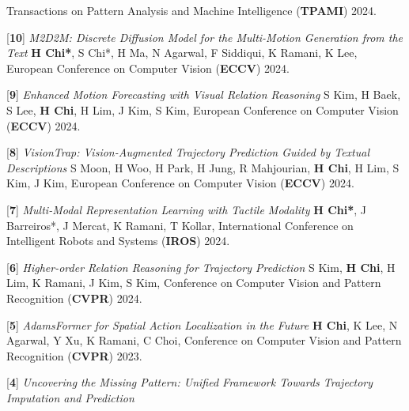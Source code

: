 \begin{cventries}
{\begin{cvitems}
{        Transactions on Pattern Analysis and Machine Intelligence (\textbf{TPAMI}) 2024.}
    \item {[\textbf{10}] \textit{M2D2M: Discrete Diffusion Model for the Multi-Motion Generation from the Text} \newline
        \hspace{1.5em} \textbf{H Chi*}, S Chi*, H Ma, N Agarwal, F Siddiqui, K Ramani, K Lee,
        European Conference on Computer Vision (\textbf{ECCV}) 2024.}
    \item {[\textbf{9}] \textit{Enhanced Motion Forecasting with Visual Relation Reasoning} \newline
        \hspace{1. em}  S Kim, H Baek, S Lee, \textbf{H Chi}, H Lim, J Kim, S Kim,
        European Conference on Computer Vision (\textbf{ECCV}) 2024.}
    \item {[\textbf{8}] \textit{VisionTrap: Vision-Augmented Trajectory Prediction Guided by Textual Descriptions}\newline
        \hspace{1. em}S Moon, H Woo, H Park, H Jung, R Mahjourian, \textbf{H Chi}, H Lim, S Kim, J Kim,
        European Conference on Computer Vision (\textbf{ECCV}) 2024.}
    \item {[\textbf{7}] \textit{Multi-Modal Representation Learning with Tactile Modality} \newline
        \hspace{1. em}\textbf{H Chi*}, J Barreiros*, J Mercat, K Ramani, T Kollar,
        International Conference on Intelligent Robots and Systems (\textbf{IROS}) 2024.}
    \item {[\textbf{6}] \textit{Higher-order Relation Reasoning for Trajectory Prediction}\newline
        \hspace{1. em}S Kim, \textbf{H Chi}, H Lim, K Ramani, J Kim, S Kim,
        Conference on Computer Vision and Pattern Recognition (\textbf{CVPR}) 2024.}
    \item {[\textbf{5}] \textit{AdamsFormer for Spatial Action Localization in the Future} \newline
        \hspace{1. em}\textbf{H Chi}, K Lee, N Agarwal, Y Xu, K Ramani, C Choi,
        Conference on Computer Vision and Pattern Recognition (\textbf{CVPR}) 2023.}
    \item {[\textbf{4}] \textit{Uncovering the Missing Pattern: Unified Framework Towards Trajectory Imputation and Prediction} \newline
}
\end{cvitems}}
\end{cventries}
